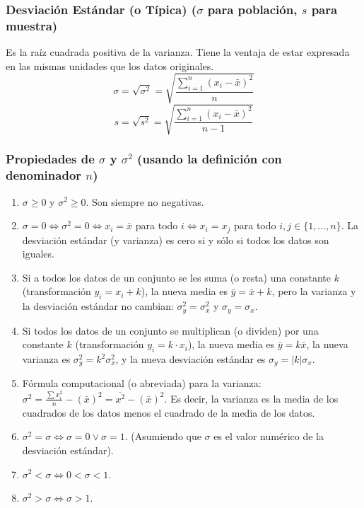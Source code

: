 \documentclass[12pt, letterpaper]{article}
\begin{document}
\subsubsection{\texorpdfstring{Desviación Estándar (o Típica) ($\sigma$ para población, $s$ para muestra)}{Desviación Estándar (o Típica) (sigma para población, s para muestra)}}
Es la raíz cuadrada positiva de la varianza. Tiene la ventaja de estar expresada en las mismas unidades que los datos originales.
\[ \sigma = \sqrt{\sigma^2} = \sqrt{\frac{\sum_{i=1}^{n} (x_i - \bar{x})^2}{n}} \]
\[ s = \sqrt{s^2} = \sqrt{\frac{\sum_{i=1}^{n} (x_i - \bar{x})^2}{n-1}} \]

\subsubsection{\texorpdfstring{Propiedades de $\sigma$ y $\sigma^2$ (usando la definición con denominador $n$)}{Propiedades de sigma y sigma-cuadrado (usando la definición con denominador n)}}
\begin{center}
	\begin{enumerate}
		\item $\sigma \ge 0$ y $\sigma^2 \ge 0$. Son siempre no negativas.
		\item $\sigma = 0 \iff \sigma^2 = 0 \iff x_i = \bar{x}$ para todo $i \iff x_i = x_j$ para todo $i, j \in \{1, \dots, n\}$. La desviación estándar (y varianza) es cero si y sólo si todos los datos son iguales.
		\item Si a todos los datos de un conjunto se les suma (o resta) una constante $k$ (transformación $y_i = x_i + k$), la nueva media es $\bar{y} = \bar{x} + k$, pero la varianza y la desviación estándar no cambian: $\sigma_y^2 = \sigma_x^2$ y $\sigma_y = \sigma_x$.
		\item Si todos los datos de un conjunto se multiplican (o dividen) por una constante $k$ (transformación $y_i = k \cdot x_i$), la nueva media es $\bar{y} = k\bar{x}$, la nueva varianza es $\sigma_y^2 = k^2 \sigma_x^2$, y la nueva desviación estándar es $\sigma_y = |k| \sigma_x$.
		\item Fórmula computacional (o abreviada) para la varianza: $\sigma^2 = \frac{\sum x_i^2}{n} - (\bar{x})^2 = \overline{x^2} - (\bar{x})^2$. Es decir, la varianza es la media de los cuadrados de los datos menos el cuadrado de la media de los datos.
		\item $\sigma^2=\sigma \iff \sigma=0 \vee \sigma=1$. (Asumiendo que $\sigma$ es el valor numérico de la desviación estándar).
		\item $\sigma^2 < \sigma \iff 0 < \sigma < 1$.
		\item $\sigma^2 > \sigma \iff \sigma > 1$.
	\end{enumerate}
\end{center}
\newpage
\end{document}
